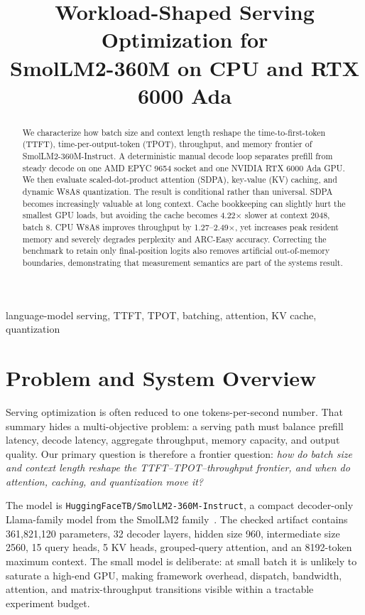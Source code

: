 \documentclass[conference]{IEEEtran}
\title{Workload-Shaped Serving Optimization for\\
SmolLM2-360M on CPU and RTX 6000 Ada}
\author{
\IEEEauthorblockN{Hanxiao \qquad Haiyang Peng}
\IEEEauthorblockA{DSAA4012 Final Project}
}
\begin{document}
\maketitle

\begin{abstract}
We characterize how batch size and context length reshape the
time-to-first-token (TTFT), time-per-output-token (TPOT), throughput, and
memory frontier of SmolLM2-360M-Instruct. A deterministic manual decode loop
separates prefill from steady decode on one AMD EPYC 9654 socket and one
NVIDIA RTX 6000 Ada GPU. We then evaluate scaled-dot-product attention
(SDPA), key-value (KV) caching, and dynamic W8A8 quantization. The result is
conditional rather than universal. SDPA becomes increasingly valuable at
long context. Cache bookkeeping can slightly hurt the smallest GPU loads,
but avoiding the cache becomes 4.22$\times$ slower at context 2048, batch 8.
CPU W8A8 improves throughput by 1.27--2.49$\times$, yet increases peak
resident memory and severely degrades perplexity and ARC-Easy accuracy.
Correcting the benchmark to retain only final-position logits also removes
artificial out-of-memory boundaries, demonstrating that measurement
semantics are part of the systems result.
\end{abstract}

\begin{IEEEkeywords}
language-model serving, TTFT, TPOT, batching, attention, KV cache,
quantization
\end{IEEEkeywords}

\section{Problem and System Overview}

Serving optimization is often reduced to one tokens-per-second number. That
summary hides a multi-objective problem: a serving path must balance prefill
latency, decode latency, aggregate throughput, memory capacity, and output
quality. Our primary question is therefore a frontier question:
\emph{how do batch size and context length reshape the TTFT--TPOT--throughput
frontier, and when do attention, caching, and quantization move it?}

The model is \texttt{HuggingFaceTB/SmolLM2-360M-Instruct}, a compact
decoder-only Llama-family model from the SmolLM2 family~\cite{smollm2}. The
checked artifact contains 361,821,120 parameters, 32 decoder layers, hidden
size 960, intermediate size 2560, 15 query heads, 5 KV heads, grouped-query
attention, and an 8192-token maximum context. The small model is deliberate:
at small batch it is unlikely to saturate a high-end GPU, making framework
overhead, dispatch, bandwidth, attention, and matrix-throughput transitions
visible within a tractable experiment budget.
\end{document}
